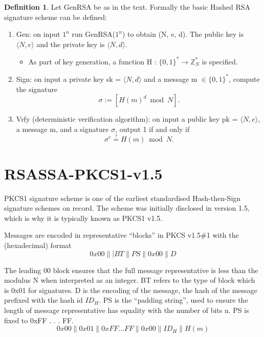 \documentclass[]{final_report}
\theoremstyle{definition}
\newtheorem{definition}{Definition}[chapter]
\begin{document}
\begin{definition}
\label{def:hashed rsa}
Let GenRSA be as in the text. Formally the basic Hashed RSA signature scheme can be defined:
\begin{mdframed}
\begin{enumerate}
    \item Gen: on input $1^n$ run GenRSA($1^n$) to obtain (N, e, d). The public key is $\langle N, e \rangle$ and the private key is $\langle N, d \rangle$.
    \begin{itemize}
    \item As part of key generation, a function H : $\{0, 1\}^* \rightarrow \mathbb{Z}^*_{N}$ is specified.
    \end{itemize}

    \item Sign: on input a private key sk = $\langle N, d \rangle$ and a message m $\in \{0, 1\}^*$, compute the signature
\[\sigma := [H(m)^d \bmod N].\]
    \item Vrfy (deterministic verification algorithm):  on input a public key pk = $\langle N, e \rangle$, a message m, and a signature $\sigma$, output 1 if and only if
    \[\sigma^e \stackrel{?}{=} H(m) \bmod N.\]
\end{enumerate}
\end{mdframed}
\end{definition}


\section{RSASSA-PKCS1-v1.5}
PKCS1 signature scheme is one of the earliest standardised Hash-then-Sign signature schemes on record. The scheme was initially disclosed in version 1.5, which is why it is typically known as PKCS1 v1.5.

Messages are encoded in representative “blocks” in PKCS v1.5\#1 with the (hexadecimal) format
\[0x00\||BT\|PS\|0x00\|D\]

The leading 00 block ensures that the full message representative is less than the modulus N when interpreted as an integer. BT refers to the type of block which is 0x01 for signatures. D is the encoding of the message, the hash of the message prefixed with the hash id $ID_{H}$. PS is the “padding string”, used to ensure the length of message representative has equality with the number of bits n. PS is fixed to 0xFF . . . FF.
\[0x00\|0x01\|0xFF . . . FF\|0x00\|ID_{H}\|H(m)\]
\end{document}
